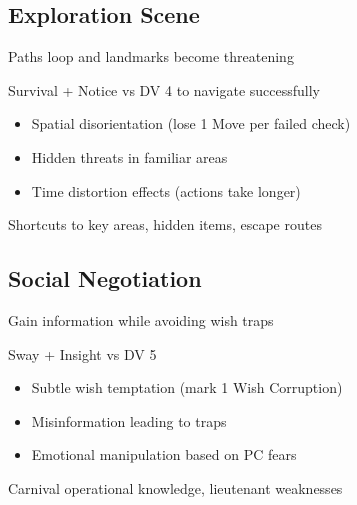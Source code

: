 \documentclass[11pt]{article}
\newenvironment{encounter}[1]{\begin{description}[leftmargin=*,style=standard]\item[\textbf{#1}]}{\end{description}}
\begin{document}
\subsection{Exploration Scene}
\begin{encounter}{Navigating Ever-Shifting Carnival Grounds}
\item[Challenge:] Paths loop and landmarks become threatening
\item[Skills:] Survival + Notice vs DV 4 to navigate successfully
\item[Hazards:] 
  \begin{itemize}
    \item Spatial disorientation (lose 1 Move per failed check)
    \item Hidden threats in familiar areas
    \item Time distortion effects (actions take longer)
  \end{itemize}
\item[Rewards:] Shortcuts to key areas, hidden items, escape routes
\end{encounter}

\subsection{Social Negotiation}
\begin{encounter}{Negotiating with Madame Zara}
\item[Challenge:] Gain information while avoiding wish traps
\item[Skills:] Sway + Insight vs DV 5
\item[Dangers:] 
  \begin{itemize}
    \item Subtle wish temptation (mark 1 Wish Corruption)
    \item Misinformation leading to traps
    \item Emotional manipulation based on PC fears
  \end{itemize}
\item[Success Rewards:] Carnival operational knowledge, lieutenant weaknesses
\end{encounter}
\end{document}
